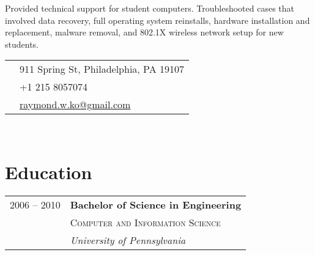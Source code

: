 \documentclass[10pt]{article} %
\begin{document}
{\begin{minipage}[t]{0.5\textwidth}
\normalsize{Provided technical support for student computers. Troubleshooted cases that involved data recovery, full operating system reinstalls, hardware installation and replacement, malware removal, and 802.1X wireless network setup for new students.}\\


\end{minipage} %
\hfill
\begin{minipage}[t]{0.44\textwidth} %
\vspace{0pt} %


\colorbox{shade}{\textcolor{text1}{
\begin{tabular}{c|p{7cm}}
\raisebox{-4pt}{\textifsymbol{18}} & 911 Spring St, Philadelphia, PA 19107\\ %
\raisebox{-3pt}{\Mobilefone} & +1 215 8057074 \\ %
\raisebox{-1pt}{\Letter} & \href{raymond.w.ko@gmail.com}{raymond.w.ko@gmail.com} \\ %
\end{tabular}
}
}\\[10pt]


\section{Education} 

\begin{tabular}{rl} %


  2006 -- 2010 & \textbf{Bachelor of Science in Engineering}\\
& \textsc{Computer and Information Science} \\
& \textit{University of Pennsylvania} 
	

\end{tabular}
\end{minipage}}
\end{document}
